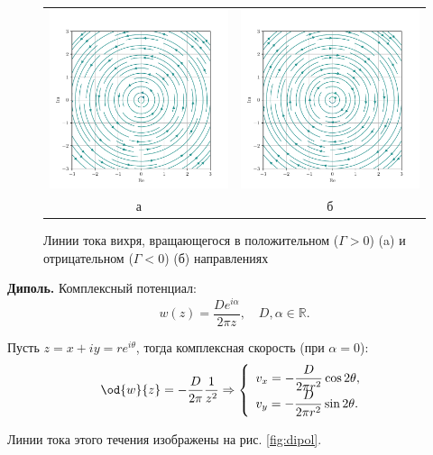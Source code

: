 \documentclass[14pt]{extarticle}
\begin{document}
\begin{problems}
\begin{figure}
	\centering
	\begin{tabular}{cc}
		\includegraphics[width=0.45\linewidth]{../img/rot_Gamma_g_0.pdf} &
		\includegraphics[width=0.45\linewidth]{../img/rot_Gamma_l_0.pdf} \\
		а & б 
	\end{tabular}
	\caption{Линии тока вихря, вращающегося в положительном ($\Gamma > 0$) (a) и отрицательном ($\Gamma < 0$) (б) направлениях}
	\label{fig:rotor}
\end{figure}

\item
\textbf{Диполь.}		
Комплексный потенциал:
\[
	w(z) = \frac{D e^{i\alpha}}{2\pi z},\quad
	D,\alpha \in\mathbb{R}.
\]
						
Пусть $z=x+iy=re^{i\theta}$, тогда комплексная скорость (при $\alpha=0$):
\[
	\od{w}{z} = -\frac{D}{2\pi}\frac{1}{z^2} \Rightarrow\displaystyle
	\left\{
	\begin{array}{l}
		v_x = -\displaystyle\frac{D}{2\pi r^2} \cos 2\theta,\\
		v_y = -\displaystyle\frac{D}{2\pi r^2} \sin 2\theta.
	\end{array}
	\right.
\]

Линии тока этого течения изображены на рис. \ref{fig:dipol}.


\end{problems}
\end{document}
